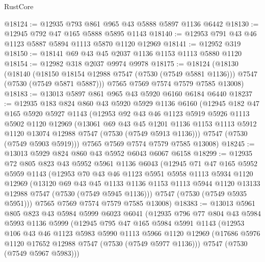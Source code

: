 \begin{lexlean}{RustCore}
\begin{coremodule}
@18124 := @12935 @793 @861 @965 @43 @5888 @5897 @1136 @6442
@18130 := @12945 @792 @47 @165 @5888 @5895 @1143
@18140 := @12953 @791 @43 @46 @1123 @5887 @5894 @1113 @5870 @1120 @12969
@18141 := @12952 @319
@18150 := @18141 @69 @43 @45 @2037 @1136 @1153 @1113 @5880 @1120
@18154 := @12982 @318 @2037 @9974 @9978
@18175 := @18124
    (@18130
      (@18140
        (@18150 @18154 @12988 @7547 (@7530 (@7549 @5881 @1136)))
        @7547
        (@7530 (@7549 @5871 @5887)))
      @7565
      @7569
      @7574
      @7579
      @7585
      @13008)
@18183 := @13013 @5897 @861 @965 @43 @5920 @6160 @6184 @6440
@18237 := @12935
    @183
    @824
    @860
    @43
    @5920
    @5929
    @1136
    @6160
    (@12945
      @182
      @47
      @165
      @5920
      @5927
      @1143
      (@12953
        @92
        @43
        @46
        @1123
        @5919
        @5926
        @1113
        @5902
        @1120
        @12969
        (@13061
          @69
          @43
          @45
          @1201
          @1136
          @1153
          @1113
          @5912
          @1120
          @13074
          @12988
          @7547
          (@7530 (@7549 @5913 @1136)))
        @7547
        (@7530 (@7549 @5903 @5919)))
      @7565
      @7569
      @7574
      @7579
      @7585
      @13008)
@18245 := @13013 @5929 @824 @860 @43 @5952 @6043 @6067 @6158
@18299 := @12935
    @72
    @805
    @823
    @43
    @5952
    @5961
    @1136
    @6043
    (@12945
      @71
      @47
      @165
      @5952
      @5959
      @1143
      (@12953
        @70
        @43
        @46
        @1123
        @5951
        @5958
        @1113
        @5934
        @1120
        @12969
        (@13120
          @69
          @43
          @45
          @1133
          @1136
          @1153
          @1113
          @5944
          @1120
          @13133
          @12988
          @7547
          (@7530 (@7549 @5945 @1136)))
        @7547
        (@7530 (@7549 @5935 @5951)))
      @7565
      @7569
      @7574
      @7579
      @7585
      @13008)
@18383 := @13013
    @5961
    @805
    @823
    @43
    @5984
    @5999
    @6023
    @6041
    (@12935
      @796
      @77
      @804
      @43
      @5984
      @5993
      @1136
      @5999
      (@12945
        @795
        @47
        @165
        @5984
        @5991
        @1143
        (@12953
          @106
          @43
          @46
          @1123
          @5983
          @5990
          @1113
          @5966
          @1120
          @12969
          (@17686 @5976 @1120 @17652 @12988 @7547 (@7530 (@7549 @5977 @1136)))
          @7547
          (@7530 (@7549 @5967 @5983)))

\end{coremodule}
\end{lexlean}
